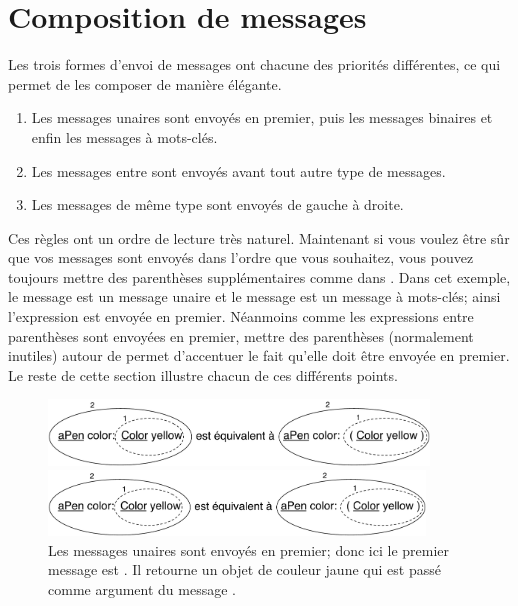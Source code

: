 \documentclass[a4paper,10pt,twoside]{book}
\begin{document}
\section{Composition de messages}
Les trois formes d'envoi de messages ont chacune des priorités différentes, ce qui permet de les composer de manière élégante.

\begin{enumerate}
\item Les messages unaires sont envoyés en premier, puis les messages binaires et enfin les messages à mots-clés.
\item Les messages entre  sont envoyés avant tout autre type de messages. 
\item Les messages de même type sont envoyés de gauche à droite. 
\end{enumerate}

Ces règles ont un ordre de lecture très naturel. Maintenant si
vous voulez être sûr que vos messages sont envoyés dans l'ordre
que vous souhaitez, vous pouvez toujours mettre des parenthèses
supplémentaires comme dans . Dans cet exemple, le
message  est un message unaire et le message 
est un message à mots-clés; ainsi l'expression 
est envoyée en premier. Néanmoins comme les expressions entre
parenthèses sont envoyées en premier, mettre des parenthèses
(normalement inutiles) autour de  permet d'accentuer
le fait qu'elle
doit être envoyée en premier. Le reste de cette section illustre
chacun de ces différents points.

\begin{figure}[ht]
\ifluluelse
	{\centerline{\includegraphics[width=0.9\textwidth]{uKeyUn}} }
	{\centerline{\includegraphics[width=10cm]{uKeyUn}} }
\caption{Les messages unaires sont envoyés en premier; donc ici le
  premier message est . Il retourne un objet de
  couleur jaune qui est passé comme argument du message .}
\end{figure}
\end{document}
